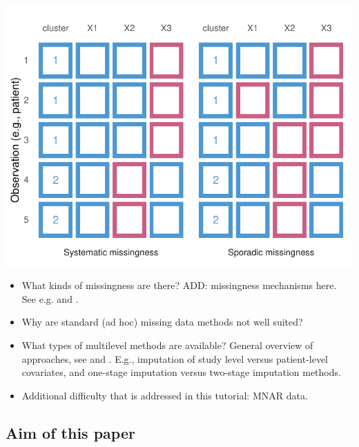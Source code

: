 \documentclass[
]{jss}
\begin{document}
\begin{CodeChunk}


\begin{center}\includegraphics{Manuscript_files/figure-latex/patterns-1} \end{center}

\end{CodeChunk}

\begin{itemize}
\item
  What kinds of missingness are there? ADD: missingness mechanisms here.
  See e.g. \citet{yuce08} and \citet{hox15}.
\item
  Why are standard (ad hoc) missing data methods not well suited?
\item
  What types of multilevel methods are available? General overview of
  approaches, see \citet{audi18} and \citet{grun18}. E.g., imputation of
  study level versus patient-level covariates, and one-stage imputation
  versus two-stage imputation methods.
\item
  Additional difficulty that is addressed in this tutorial: MNAR data.
\end{itemize}

\hypertarget{aim-of-this-paper}{%
\subsection{Aim of this paper}\label{aim-of-this-paper}}
\end{document}
